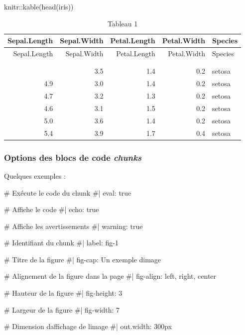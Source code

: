 \documentclass[
  french,
  11pt,
  a4paper,
]{article}
\newenvironment{Shaded}{\begin{snugshade}}{\end{snugshade}}
\newcommand{\CommentTok}[1]{\textcolor[rgb]{0.37,0.37,0.37}{#1}}
\newcommand{\FunctionTok}[1]{\textcolor[rgb]{0.28,0.35,0.67}{#1}}
\newcommand{\NormalTok}[1]{\textcolor[rgb]{0.00,0.23,0.31}{#1}}
\newcommand{\SpecialCharTok}[1]{\textcolor[rgb]{0.37,0.37,0.37}{#1}}
\begin{document}
\begin{Shaded}
\begin{Highlighting}[]
\NormalTok{knitr}\SpecialCharTok{::}\FunctionTok{kable}\NormalTok{(}\FunctionTok{head}\NormalTok{(iris))}
\end{Highlighting}
\end{Shaded}

\begin{longtable}[]{@{}rrrrl@{}}
\toprule\noalign{}
Sepal.Length & Sepal.Width & Petal.Length & Petal.Width & Species \\
\midrule\noalign{}
\endfirsthead
\toprule\noalign{}
Sepal.Length & Sepal.Width & Petal.Length & Petal.Width & Species \\
\midrule\noalign{}
\endhead
\bottomrule\noalign{}
\tabularnewline
\caption{Tableau 1}\tabularnewline
\endlastfoot
5.1 & 3.5 & 1.4 & 0.2 & setosa \\
4.9 & 3.0 & 1.4 & 0.2 & setosa \\
4.7 & 3.2 & 1.3 & 0.2 & setosa \\
4.6 & 3.1 & 1.5 & 0.2 & setosa \\
5.0 & 3.6 & 1.4 & 0.2 & setosa \\
5.4 & 3.9 & 1.7 & 0.4 & setosa \\
\end{longtable}

\subsubsection{\texorpdfstring{Options des blocs de code
\emph{chunks}}{Options des blocs de code chunks}}\label{options-des-blocs-de-code-chunks}

Quelques exemples :

\begin{Shaded}
\begin{Highlighting}[]
\CommentTok{\# Exécute le code du chunk}
\CommentTok{\#| eval: true}

\CommentTok{\# Affiche le code}
\CommentTok{\#| echo: true}

\CommentTok{\# Affiche les avertissements}
\CommentTok{\#| warning: true}

\CommentTok{\# Identifiant du chunk}
\CommentTok{\#| label: fig{-}1}

\CommentTok{\# Titre de la figure}
\CommentTok{\#| fig{-}cap: Un exemple d\textquotesingle{}image}

\CommentTok{\# Alignement de la figure dans la page}
\CommentTok{\#| fig{-}align: left, right, center}

\CommentTok{\# Hauteur de la figure}
\CommentTok{\#| fig{-}height: 3}

\CommentTok{\# Largeur de la figure}
\CommentTok{\#| fig{-}width: 7}

\CommentTok{\# Dimension d\textquotesingle{}affichage de l\textquotesingle{}image}
\CommentTok{\#| out.width: 300px}
\end{Highlighting}
\end{Shaded}
\end{document}
